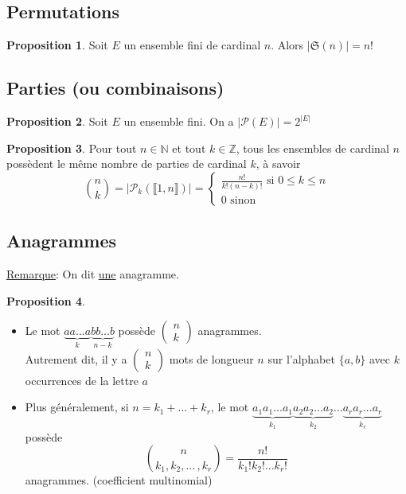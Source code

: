\documentclass[10pt,a4paper]{article}
\theoremstyle{definition}
\newtheorem{proposition}{Proposition}[section]
\begin{document}
\subsection{Permutations}
\begin{proposition}
Soit $E$ un ensemble fini de cardinal $n$. Alors $| \mathfrak{S}(n)| = n!$
\end{proposition}

\subsection{Parties (ou combinaisons)}
\begin{proposition}
Soit $E$ un ensemble fini. On a $|\mathcal{P}(E)| = 2^{|E|}$
\end{proposition}
\begin{proposition}
Pour tout $n \in \mathbb{N}$ et tout $k \in \mathbb{Z}$, tous les ensembles de cardinal $n$ possèdent le même nombre de parties de cardinal $k$, à savoir
\[ \binom{n}{k} = |\mathcal{P}_k(\llbracket 1, n \rrbracket)| = \begin{cases}
\frac{n!}{k!(n - k)!} \text{ si } 0 \leq k \leq n\\
0 \text{ sinon }
\end{cases} \]
\end{proposition}

\subsection{Anagrammes}
\noindent \uline{Remarque}: On dit \uline{une} anagramme.
\begin{proposition}
\hfill 
\begin{itemize}
\item Le mot $\underbrace{aa...a}_k \underbrace{bb...b}_{n - k}$ possède $\begin{pmatrix}
n \\ k
\end{pmatrix}$ anagrammes. \\
Autrement dit, il y a $\begin{pmatrix}
n \\ k
\end{pmatrix}$ mots de longueur $n$ sur l'alphabet $\{ a, b \}$ avec $k$ occurrences de la lettre $a$
\item Plus généralement, si $n = k_1 + ... + k_r$, le mot $\underbrace{a_1 a_1 ... a_1}_{k_1} \underbrace{a_2 a_2 ... a_2}_{k_2} ... \underbrace{a_r a_r ... a_r}_{k_r}$ possède
\[ \binom{n}{k_1, k_2, ...\,, k_r} = \frac{n!}{k_1! k_2! ... k_r!} \]
anagrammes. (coefficient multinomial)
\end{itemize}
\end{proposition}
\end{document}
